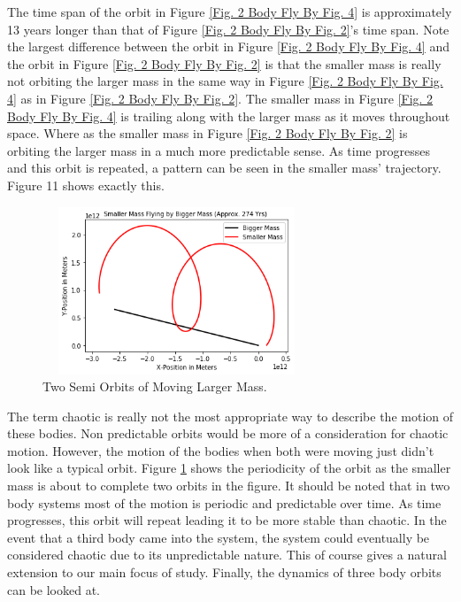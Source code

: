 \documentclass[twocolumn]{article}
\begin{document}
\par \noindent
The time span of the orbit in Figure \ref{Fig. 2 Body Fly By Fig. 4} is approximately 13 years longer than that of Figure \ref{Fig. 2 Body Fly By Fig. 2}'s time span. Note the largest difference between the orbit in Figure \ref{Fig. 2 Body Fly By Fig. 4} and the orbit in Figure \ref{Fig. 2 Body Fly By Fig. 2} is that the smaller mass is really not orbiting the larger mass in the same way in Figure \ref{Fig. 2 Body Fly By Fig. 4} as in Figure \ref{Fig. 2 Body Fly By Fig. 2}. The smaller mass in Figure \ref{Fig. 2 Body Fly By Fig. 4} is trailing along with the larger mass as it moves throughout space. Where as the smaller mass in Figure \ref{Fig. 2 Body Fly By Fig. 2} is orbiting the larger mass in a much more predictable sense. As time progresses and this orbit is repeated, a pattern can be seen in the smaller mass' trajectory. Figure 11 shows exactly this.
\begin{figure}[h]
    \centering
    \includegraphics[width=8cm, height=5cm]{Figures/2-Body Fly By (5).png}
    \caption{\small{Two Semi Orbits of Moving Larger Mass.}}
    \label{Fig. 2 Body Fly By Fig. 5}
\end{figure}
\par \noindent
The term chaotic is really not the most appropriate way to describe the motion of these bodies. Non predictable orbits would be more of a consideration for chaotic motion. However, the motion of the bodies when both were moving just didn't look like a typical orbit. Figure \ref{Fig. 2 Body Fly By Fig. 5} shows the periodicity of the orbit as the smaller mass is about to complete two orbits in the figure. It should be noted that in two body systems most of the motion is periodic and predictable over time. As time progresses, this orbit will repeat leading it to be more stable than chaotic. In the event that a third body came into the system, the system could eventually be considered chaotic due to its unpredictable nature. This of course gives a natural extension to our main focus of study. Finally, the dynamics of three body orbits can be looked at.
\end{document}
